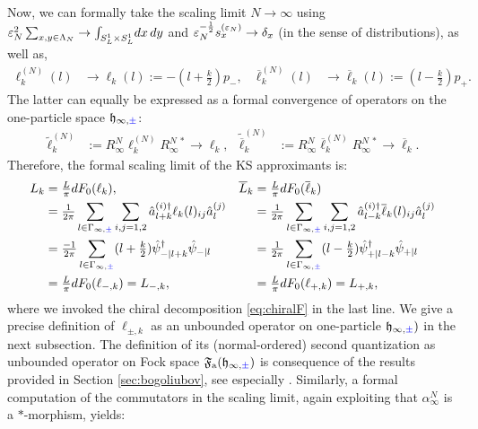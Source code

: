 \documentclass[a4paper, 11pt]{article}
\newcommand{\ua}{\textup a}
\newcommand{\fF}{\mathfrak{F}}\newcommand{\cF}{\mathcal{F}}\newcommand{\dF}{\mathds{F}}\newcommand{\sF}{\mathscr{F}}
\newcommand{\fh}{\mathfrak{h}}
\DeclareMathOperator{\1}{\mathds{1}}
\begin{document}
Now, we can formally take the scaling limit $N\rightarrow\infty$ using $\varepsilon_{N}^{2}\sum_{x,y\in\Lambda_{N}}\rightarrow\int_{S^{1}_{L}\times S^{1}_{L}}\!dx\!\ dy$ and $\varepsilon_{N}^{-\frac{1}{2}}s^{(\varepsilon_{N})}_{x}\rightarrow\delta_{x}$ (in the sense of distributions), as well as,
\begin{align}
\label{eq:scalelim1pvira}
 \ell^{(N)}_{k}(l) & \rightarrow \ell_{k}(l) := -(l+\tfrac{k}{2})p_{-}, & \overline{\ell}^{(N)}_{k}(l) & \rightarrow \overline{\ell}_{k}(l) := (l-\tfrac{k}{2})p_{+}.
\end{align}
The latter can equally be expressed as a formal convergence of operators on the one-particle space $\fh_{\infty,{\color{blue}\pm}}$:
\begin{align}
\label{eq:latviraconv1pformal}
\tilde{\ell}^{(N)}_{k} & := R^{N}_{\infty}\ell^{(N)}_{k}R^{N\!\ *}_{\infty} \rightarrow \ell_{k}, & \tilde{\overline{\ell}}^{(N)}_{k} & := R^{N}_{\infty}\overline{\ell}^{(N)}_{k}R^{N\!\ *}_{\infty} \rightarrow \overline{\ell}_{k}.
\end{align}
Therefore, the formal scaling limit of the KS approximants is:
\begin{align}
\label{eq:scalelimvira}
L_{k} & = \tfrac{L}{\pi}dF_{0}(\ell_{k}), & \overline{L}_{k} & = \tfrac{L}{\pi}dF_{0}(\overline{\ell}_{k}) \\ \nonumber
& = \tfrac{1}{2\pi}\sum_{l\in\Gamma_{\infty,{\color{blue}\pm}}}\sum_{i,j=1,2}\hat{a}^{(i)\dag}_{l+k}\ell_{k}(l)_{ij}\hat{a}^{(j)}_{l} &
 & = \tfrac{1}{2\pi}\sum_{l\in\Gamma_{\infty,{\color{blue}\pm}}}\sum_{i,j=1,2}\hat{a}^{(i)\dag}_{l-k}\overline{\ell}_{k}(l)_{ij}\hat{a}^{(j)} _{l} \\ \nonumber
 & = \tfrac{-1}{2\pi}\sum_{l\in\Gamma_{\infty,{\color{blue}\pm}}}(l+\tfrac{k}{2})\hat{\psi}^{\dag}_{-|l+k}\hat{\psi}_{-|l} &  & = \tfrac{1}{2\pi}\sum_{l\in\Gamma_{\infty,{\color{blue}\pm}}}(l-\tfrac{k}{2})\hat{\psi}^{\dag}_{+|l-k}\hat{\psi}_{+|l} \\ \nonumber
 & = \tfrac{L}{\pi}dF_{0}(\ell_{-,k}) = L_{-,k}, &  & = \tfrac{L}{\pi}dF_{0}(\ell_{+,k}) = L_{+,k},
\end{align}
where we invoked the chiral decomposition \eqref{eq:chiralF} in the last line. We give a precise definition of $\ell_{\pm,k}$ as an unbounded operator on one-particle $\fh_{\infty,{\color{blue}\pm}})$ in the next subsection. The definition of its (normal-ordered) second quantization as unbounded operator on Fock space $\fF_{\ua}(\fh_{\infty,{\color{blue}\pm}})$ is consequence of the results provided in Section \ref{sec:bogoliubov}, see especially \cite{CareyOnFermionGauge}. Similarly, a formal computation of the commutators in the scaling limit, again exploiting that $\alpha^{N}_{\infty}$ is a $*$-morphism, yields:
\end{document}
